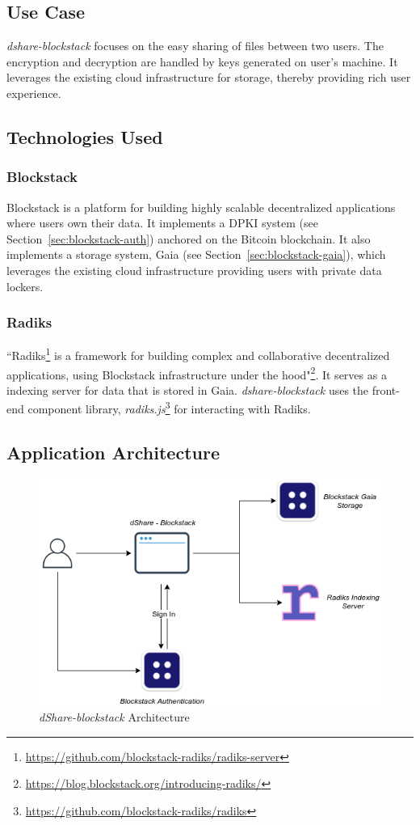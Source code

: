 \subsection{Use Case}
\textit{dshare-blockstack} focuses on the easy sharing of files between two users. The encryption and decryption are handled by keys generated on user's machine. It leverages the existing cloud infrastructure for storage, thereby providing rich user experience.

\subsection{Technologies Used}
\subsubsection{Blockstack}
Blockstack\cite{ali2016blockstack} is a platform for building highly scalable decentralized applications where users own their data. It implements a DPKI system (see Section~\ref{sec:blockstack-auth}) anchored on the Bitcoin blockchain. It also implements a storage system, Gaia (see Section~\ref{sec:blockstack-gaia}), which leverages the existing cloud infrastructure providing users with private data lockers.

\subsubsection{Radiks}
``Radiks\footnote{\url{https://github.com/blockstack-radiks/radiks-server}} is a framework for building complex and collaborative decentralized applications, using Blockstack infrastructure under the hood"\footnote{\url{https://blog.blockstack.org/introducing-radiks/}}. It serves as a indexing server for data that is stored in Gaia. \textit{dshare-blockstack} uses the front-end component library, \textit{radiks.js}\footnote{\url{https://github.com/blockstack-radiks/radiks}} for interacting with Radiks.

\subsection{Application Architecture}
\begin{figure}[h]
	\includegraphics[width=\linewidth]{figures/dshare-blockstack}
	\caption{\label{fig:dshare-blockstack} \textit{dShare-blockstack} Architecture}
\end{figure}

